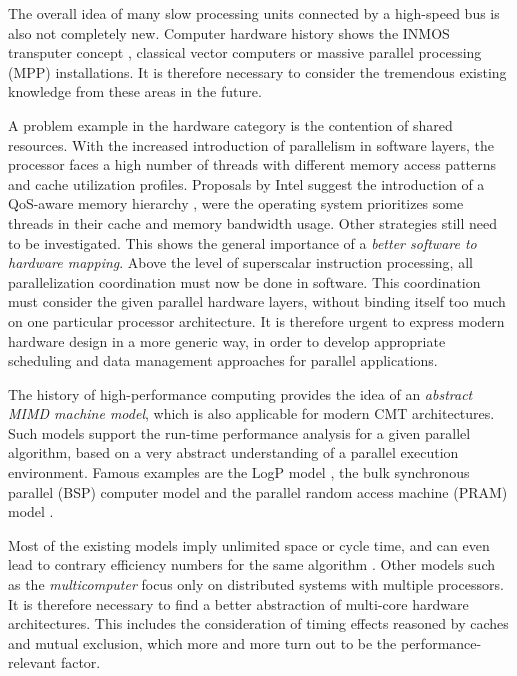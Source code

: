 \documentclass[a4paper]{article}
\begin{document}
The overall idea of many slow processing units connected by a high-speed bus is also not completely new. Computer hardware history shows the INMOS transputer concept \cite{may:95}, classical vector computers or massive parallel processing (MPP) installations. It is therefore necessary to consider the tremendous existing knowledge from these areas in the future.

A problem example in the hardware category is the contention of shared resources. With the increased introduction of parallelism in software layers, the processor faces a high number of threads with different memory access patterns and cache utilization profiles. Proposals by Intel suggest the introduction of a QoS-aware memory hierarchy \cite{qosmemhierarchy}, were the operating system prioritizes some threads in their cache and memory bandwidth usage. Other strategies still need to be investigated. This shows the general importance of a \emph{better software to hardware mapping}. Above the level of superscalar instruction processing, all parallelization coordination must now be done in software. This coordination must consider the given parallel hardware layers, without binding itself too much on one particular processor architecture.  It is therefore urgent to express modern hardware design in a more generic way, in order to develop appropriate scheduling and data management approaches for parallel applications. 

The history of high-performance computing provides the idea of an \emph{abstract MIMD machine model}, which is also applicable for modern CMT architectures. Such models support the run-time performance analysis for a given parallel algorithm, based on a very abstract understanding of a parallel execution environment. Famous examples are the LogP model \cite{culler93logp}, the bulk synchronous parallel (BSP) computer model \cite{bsp} and the parallel random access machine (PRAM) model \cite{pram}. 

Most of the existing models imply unlimited space or cycle time, and can even lead to contrary efficiency numbers for the same algorithm \cite{whatisscalability}. Other models such as the \emph{multicomputer} \cite{fosterparprog} focus only on distributed systems with multiple processors. It is therefore necessary to find a better abstraction of multi-core hardware architectures. This includes the consideration of timing effects reasoned by caches and mutual exclusion, which more and more turn out to be the performance-relevant factor. 
\end{document}
